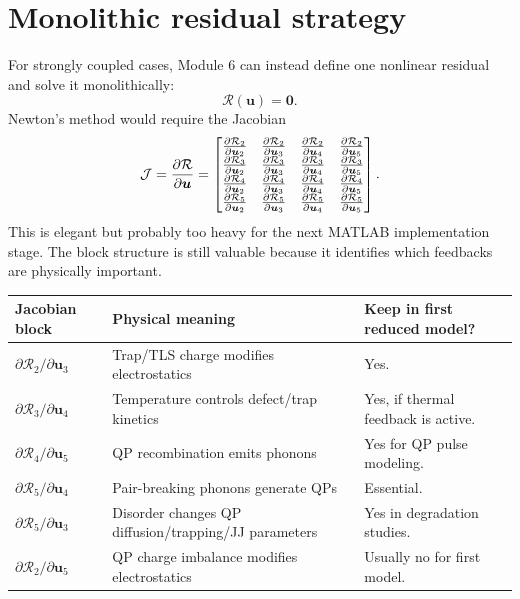 \documentclass[11pt]{article}
\newcommand{\state}{\bm{u}}
\newcommand{\Rtwo}{\mathcal{R}_2}
\newcommand{\Rthree}{\mathcal{R}_3}
\newcommand{\Rfour}{\mathcal{R}_4}
\newcommand{\Rfive}{\mathcal{R}_5}
\begin{document}
\section{Monolithic residual strategy}

For strongly coupled cases, Module 6 can instead define one nonlinear residual and solve it monolithically:
\begin{equation}
\mathcal{R}(\state)=\bm{0}.
\end{equation}
Newton's method would require the Jacobian
\begin{equation}
\mathcal{J}=\pdv{\mathcal{R}}{\state}
=\begin{bmatrix}
\pdv{\Rtwo}{\state_2} & \pdv{\Rtwo}{\state_3} & \pdv{\Rtwo}{\state_4} & \pdv{\Rtwo}{\state_5}\\
\pdv{\Rthree}{\state_2} & \pdv{\Rthree}{\state_3} & \pdv{\Rthree}{\state_4} & \pdv{\Rthree}{\state_5}\\
\pdv{\Rfour}{\state_2} & \pdv{\Rfour}{\state_3} & \pdv{\Rfour}{\state_4} & \pdv{\Rfour}{\state_5}\\
\pdv{\Rfive}{\state_2} & \pdv{\Rfive}{\state_3} & \pdv{\Rfive}{\state_4} & \pdv{\Rfive}{\state_5}
\end{bmatrix}.
\end{equation}
This is elegant but probably too heavy for the next MATLAB implementation stage. The block structure is still valuable because it identifies which feedbacks are physically important.

\begin{center}
\begin{tabularx}{\textwidth}{p{}p{}X}
\toprule
\textbf{Jacobian block} & \textbf{Physical meaning} & \textbf{Keep in first reduced model?}\\
\midrule
\(\partial \Rtwo/\partial \state_3\) & Trap/TLS charge modifies electrostatics & Yes.\\
\(\partial \Rthree/\partial \state_4\) & Temperature controls defect/trap kinetics & Yes, if thermal feedback is active.\\
\(\partial \Rfour/\partial \state_5\) & QP recombination emits phonons & Yes for QP pulse modeling.\\
\(\partial \Rfive/\partial \state_4\) & Pair-breaking phonons generate QPs & Essential.\\
\(\partial \Rfive/\partial \state_3\) & Disorder changes QP diffusion/trapping/JJ parameters & Yes in degradation studies.\\
\(\partial \Rtwo/\partial \state_5\) & QP charge imbalance modifies electrostatics & Usually no for first model.\\
\bottomrule
\end{tabularx}
\end{center}
\end{document}
